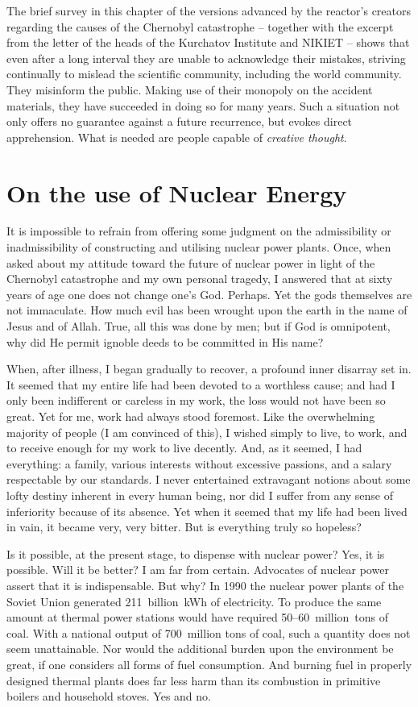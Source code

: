 \documentclass[openright]{bookest}
\begin{document}
The brief survey in this chapter of the versions advanced by the reactor's creators regarding the causes of the Chernobyl catastrophe -- together with the excerpt from the letter of the heads of the Kurchatov Institute and NIKIET -- shows that even after a long interval they are unable to acknowledge their mistakes, striving continually to mislead the scientific community, including the world community. They misinform the public. Making use of their monopoly on the accident materials, they have succeeded in doing so for many years. Such a situation not only offers no guarantee against a future recurrence, but evokes direct apprehension. What is needed are people capable of \textit{creative thought}.

\chapter{On the use of Nuclear Energy}

It is impossible to refrain from offering some judgment on the admissibility or inadmissibility of constructing and utilising nuclear power plants. Once, when asked about my attitude toward the future of nuclear power in light of the Chernobyl catastrophe and my own personal tragedy, I answered that at sixty years of age one does not change one's God. Perhaps. Yet the gods themselves are not immaculate. How much evil has been wrought upon the earth in the name of Jesus and of Allah. True, all this was done by men; but if God is omnipotent, why did He permit ignoble deeds to be committed in His name?

When, after illness, I began gradually to recover, a profound inner disarray set in. It seemed that my entire life had been devoted to a worthless cause; and had I only been indifferent or careless in my work, the loss would not have been so great. Yet for me, work had always stood foremost. Like the overwhelming majority of people (I am convinced of this), I wished simply to live, to work, and to receive enough for my work to live decently. And, as it seemed, I had everything: a family, various interests without excessive passions, and a salary respectable by our standards. I never entertained extravagant notions about some lofty destiny inherent in every human being, nor did I suffer from any sense of inferiority because of its absence. Yet when it seemed that my life had been lived in vain, it became very, very bitter. But is everything truly so hopeless?

Is it possible, at the present stage, to dispense with nuclear power? Yes, it is possible. Will it be better? I am far from certain. Advocates of nuclear power assert that it is indispensable. But why? In 1990 the nuclear power plants of the Soviet Union generated \num{211}~billion~\unit{\kWh} of electricity. To produce the same amount at thermal power stations would have required \numrange{50}{60}~million~tons of coal. With a national output of \num{700}~million tons of coal, such a quantity does not seem unattainable. Nor would the additional burden upon the environment be great, if one considers all forms of fuel consumption. And burning fuel in properly designed thermal plants does far less harm than its combustion in primitive boilers and household stoves. Yes and no.
\end{document}
